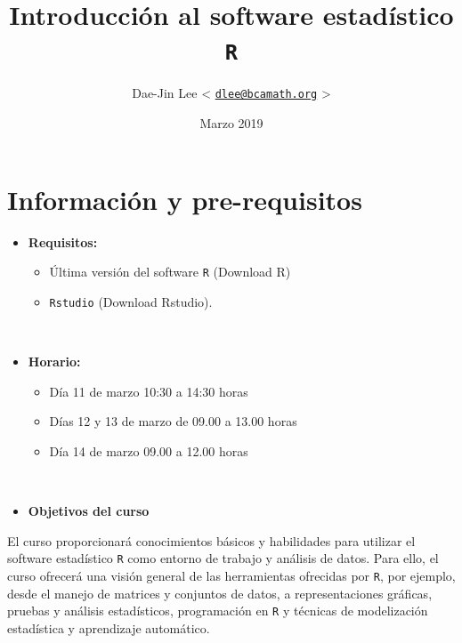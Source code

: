 \documentclass[]{book}
\title{Introducción al software estadístico \texttt{R}}
\author{Dae-Jin Lee \textless{}
\href{mailto:dlee@bcamath.org}{\nolinkurl{dlee@bcamath.org}}
\textgreater{}}
\date{Marzo 2019}
\providecommand{\tightlist}{%
  \setlength{\itemsep}{0pt}\setlength{\parskip}{0pt}}
\begin{document}
\maketitle

{
\setcounter{tocdepth}{1}
\tableofcontents
}
\chapter{Información y
pre-requisitos}\label{informacion-y-pre-requisitos}

\begin{itemize}
\item
  \textbf{Requisitos:}

  \begin{itemize}
  \tightlist
  \item
    Última versión del software \texttt{R} (Download R)
  \item
    \texttt{Rstudio} (Download Rstudio).
  \end{itemize}
\end{itemize}

~

\begin{itemize}
\item
  \textbf{Horario:}

  \begin{itemize}
  \tightlist
  \item
    Día 11 de marzo 10:30 a 14:30 horas
  \item
    Días 12 y 13 de marzo de 09.00 a 13.00 horas
  \item
    Día 14 de marzo 09.00 a 12.00 horas
  \end{itemize}
\end{itemize}

~

\begin{itemize}
\tightlist
\item
  \textbf{Objetivos del curso}
\end{itemize}

El curso proporcionará conocimientos básicos y habilidades para utilizar
el software estadístico \texttt{R} como entorno de trabajo y análisis de
datos. Para ello, el curso ofrecerá una visión general de las
herramientas ofrecidas por \texttt{R}, por ejemplo, desde el manejo de
matrices y conjuntos de datos, a representaciones gráficas, pruebas y
análisis estadísticos, programación en \texttt{R} y técnicas de
modelización estadística y aprendizaje automático.
\end{document}
